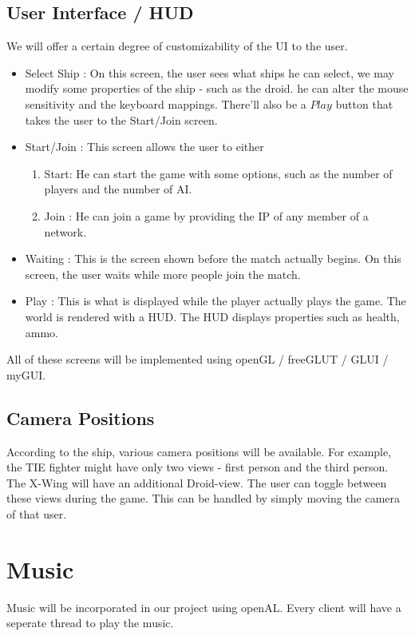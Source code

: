 \documentclass[]{article}
\begin{document}
\subsection{User Interface / HUD}
We will offer a certain degree of customizability of the UI to the user. 
\begin{itemize}
\item Select Ship : On this screen, the user sees what ships he can select, we may modify some properties of the ship - such as the droid. he can alter the mouse sensitivity and the keyboard mappings. There'll also be a $Play$ button that takes the user to the Start/Join screen.
\item Start/Join : This screen allows the user to either
	\begin{enumerate}
	\item Start: He can start the game with some options, such as the number of players and the number of AI.
	\item Join : He can join a game by providing the IP of any member of a network.
	\end{enumerate}
\item Waiting : This is the screen shown before the match actually begins. On this screen, the user waits while more people join the match.
	\item Play : This is what is displayed while the player actually plays the game. The world is rendered with a HUD. The HUD displays properties such as health, ammo.	
\end{itemize}

\noindent All of these screens will be implemented using openGL / freeGLUT / GLUI / myGUI. %
\subsection{Camera Positions}
According to the ship, various camera positions will be available. For example, the TIE fighter might have only two views - first person and the third person. The X-Wing will have an additional Droid-view. The user can toggle between these views during the game. This can be handled by simply moving the camera of that user.
\section{Music}
Music will be incorporated in our project using openAL. Every client will have a seperate thread to play the music.
\end{document}
